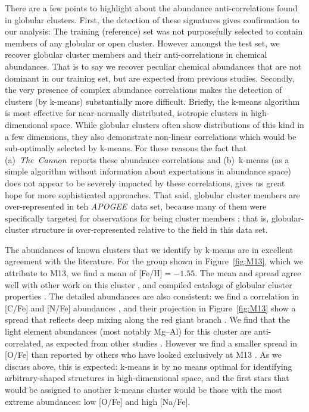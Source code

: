 \documentclass[manuscript, letterpaper]{aastex6}
\newcommand{\acronym}[1]{{\small{#1}}}
\newcommand{\project}[1]{\textsl{#1}}
\newcommand{\apogee}{\project{\acronym{APOGEE}}}
\newcommand{\thecannon}{\project{The~Cannon}}
\renewcommand{\figurename}{Figure} %
\begin{document}
There are a few points to highlight about the abundance anti-correlations
found in globular clusters. First, the detection of these signatures gives
confirmation to our analysis: The training (reference) set was not purposefully selected
to contain members of any globular or open cluster. However amongst the test
set, we recover globular cluster members and their anti-correlations 
in chemical abundances. That is to
say we recover peculiar chemical abundances that are not dominant in our
training set, but are expected from previous studies. Secondly, the very
presence of complex abundance correlations makes the detection of clusters
(by k-means) substantially more difficult. Briefly, the k-means algorithm
is most effective for near-normally distributed, isotropic clusters in high-dimensional space.
While globular clusters often show distributions of this kind in a few dimensions,
they also demonstrate non-linear correlations which would be
sub-optimally selected by k-means. For these reasons the fact that (a)~\thecannon\
reports these abundance correlations and (b)~k-means (as a simple algorithm
without information about expectations in abundance space) does not appear to be
severely impacted by these correlations, gives us great hope for more sophisticated approaches.
That said, globular cluster members are over-represented in teh \apogee\ data set,
because many of them were specifically targeted for observations for being cluster
members \citep{apogee}; that is, globular-cluster structure is over-represented relative to the
field in this data set.

The abundances of known clusters that we identify by k-means are in
excellent agreement with the literature. For the group shown in \figurename~\ref{fig:M13},
which we attribute to M13, we find a mean of [Fe/H]$ = -1.55$.
The mean and spread agree well with other work on this cluster
\citep{Kraft_1992,Cohen_Melendez_2005,Johnson_Pilachowski_2012}, and compiled catalogs of
globular cluster properties \citep[][accessed 2016]{Harris_1996}. The detailed abundances are also
consistent: we find a correlation in [C/Fe] and [N/Fe] abundances \citep{Smith_2005}, and their
projection in \figurename~\ref{fig:M13} show a spread that reflects deep mixing
along the red giant branch \citep{Briley_2004}. We find that the light element
abundances (most notably Mg--Al) for this cluster are anti-correlated, as
expected from other studies \citep[for example,][]{gratton}. However we find a
smaller spread in [O/Fe] than reported by others who have looked exclusively
at M13 \citep{Johnson_Pilachowski_2012}.  As we discuss above, this is expected:
k-means is by no means optimal for identifying arbitrary-shaped structures
in high-dimensional space, and the first stars that would be assigned to another k-means
cluster would be those with the most extreme abundances: low [O/Fe] and
high [Na/Fe].
\end{document}
